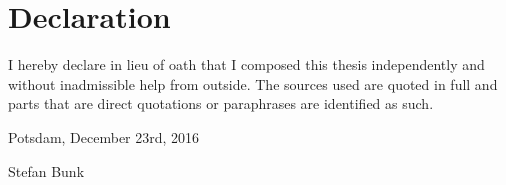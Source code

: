 \documentclass[
        a4paper,
        titlepage,
        twoside,
        parskip
        ]{scrbook}
\theoremstyle{break}
\begin{document}
\cleardoublepage
\section*{Declaration}
\label{sec:declaration}


I hereby declare in lieu of oath that I composed this thesis independently and without inadmissible help from outside. The sources used are quoted in full and parts that are direct quotations or paraphrases are identified as such.

\vspace{14mm}

Potsdam, December 23rd, 2016

\vspace{20 mm}

Stefan Bunk






\end{document}
